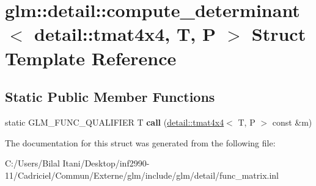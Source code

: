 \hypertarget{structglm_1_1detail_1_1compute__determinant_3_01detail_1_1tmat4x4_00_01_t_00_01_p_01_4}{}\section{glm\+:\+:detail\+:\+:compute\+\_\+determinant$<$ detail\+:\+:tmat4x4, T, P $>$ Struct Template Reference}
\label{structglm_1_1detail_1_1compute__determinant_3_01detail_1_1tmat4x4_00_01_t_00_01_p_01_4}
\subsection*{Static Public Member Functions}
\begin{DoxyCompactItemize}
\item 
static G\+L\+M\+\_\+\+F\+U\+N\+C\+\_\+\+Q\+U\+A\+L\+I\+F\+I\+ER T {\bfseries call} (\hyperlink{structglm_1_1detail_1_1tmat4x4}{detail\+::tmat4x4}$<$ T, P $>$ const \&m)\hypertarget{structglm_1_1detail_1_1compute__determinant_3_01detail_1_1tmat4x4_00_01_t_00_01_p_01_4_aa7fa7eae68f9b10c3ac3a80bca669c98}{}\label{structglm_1_1detail_1_1compute__determinant_3_01detail_1_1tmat4x4_00_01_t_00_01_p_01_4_aa7fa7eae68f9b10c3ac3a80bca669c98}

\end{DoxyCompactItemize}


The documentation for this struct was generated from the following file\+:\begin{DoxyCompactItemize}
\item 
C\+:/\+Users/\+Bilal Itani/\+Desktop/inf2990-\/11/\+Cadriciel/\+Commun/\+Externe/glm/include/glm/detail/func\+\_\+matrix.\+inl\end{DoxyCompactItemize}
